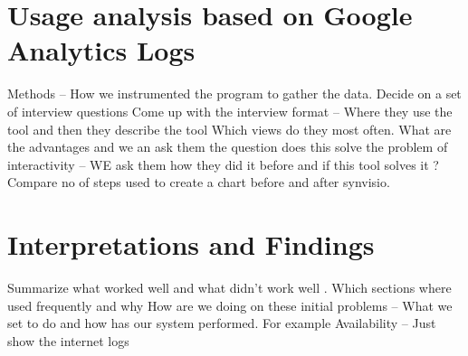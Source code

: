  
\section{Usage analysis based on Google Analytics Logs}
Methods – How we instrumented the program to gather the data.
Decide on a set of interview questions 
Come up with the interview format – Where they use the tool and then they describe the tool
Which views do they most often.
What are the advantages and we an ask them the question does this solve the problem of interactivity – WE ask them how they did it before and if this tool solves it ?
Compare no of steps used to create a chart before and after synvisio.

\section{Interpretations and Findings}  
Summarize what worked well and what didn’t work well .
Which sections where used frequently and why 
How are we doing on these initial problems – What we set to do and how has our system performed.
For example Availability – Just show the internet logs

